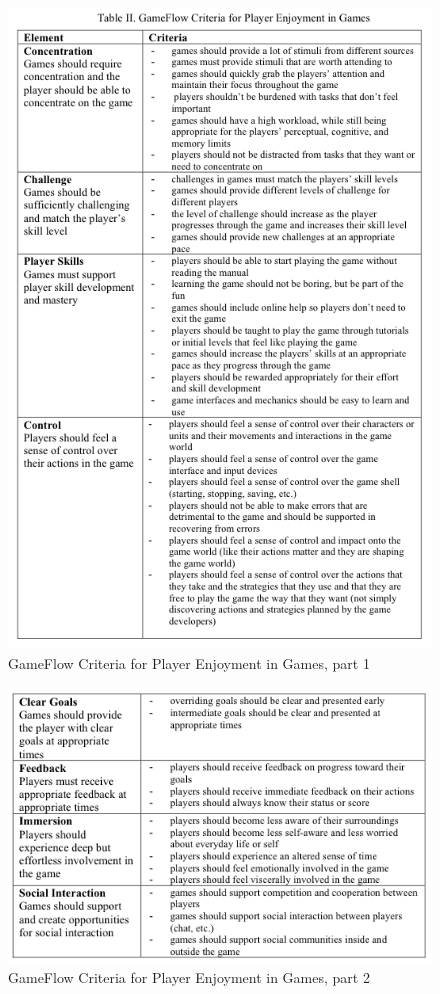 \begin{figure} [ht!]
\centering
\includegraphics[scale=0.7]{gameflow1}
\caption{GameFlow Criteria for Player Enjoyment in Games, part 1 \cite{sweetser}}
\label{fig:gameflow1}
\end{figure}  

\begin{figure} [ht!]
\centering
\includegraphics[scale=0.7]{gameflow2}
\caption{GameFlow Criteria for Player Enjoyment in Games, part 2 \cite{sweetser}}
\label{fig:gameflow2}
\end{figure}  

